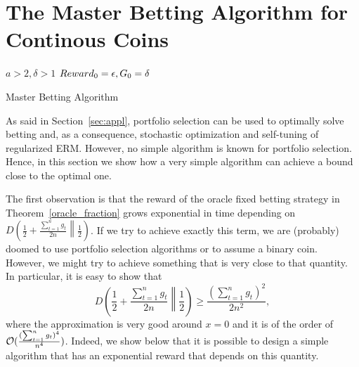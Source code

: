 \section{The Master Betting Algorithm for Continous Coins}
\label{sec:algo}

\begin{algorithm}[ht]
  \begin{algorithmic}
  {
     $a>2,\delta>1$
     $Reward_0=\epsilon,G_0=\delta$
    \ENDFOR
  }
  \end{algorithmic}
  \caption{Master Betting Algorithm}
  \label{alg:cocob}
\end{algorithm}

As said in Section~\ref{sec:appl}, portfolio selection can be used to optimally solve betting and, as a consequence, stochastic optimization and self-tuning of regularized \ac{ERM}. However, no simple algorithm is known for portfolio selection.
Hence, in this section we show how a very simple algorithm can achieve a bound close to the optimal one.

The first observation is that the reward of the oracle fixed betting strategy in Theorem~\ref{oracle_fraction} grows exponential in time depending on $D\left(\frac{1}{2}+\frac{\sum_{t=1}^n g_t}{2 n}\middle\|\frac{1}{2}\right)$. If we try to achieve exactly this term, we are (probably) doomed to use portfolio selection algorithms or to assume a binary coin.
However, we might try to achieve something that is very close to that quantity.
In particular, it is easy to show that
\[
D\left(\frac{1}{2}+\frac{\sum_{t=1}^n g_t}{2 n}\middle\|\frac{1}{2}\right) \geq \frac{(\sum_{t=1}^n g_t)^2}{2 n^2},
\]
where the approximation is very good around $x=0$ and it is of the order of $\mathcal{O}(\frac{(\sum_{t=1}^n g_t)^4}{ n^4})$. Indeed, we show below that it is possible to design a simple algorithm that has an exponential reward that depends on this quantity.

